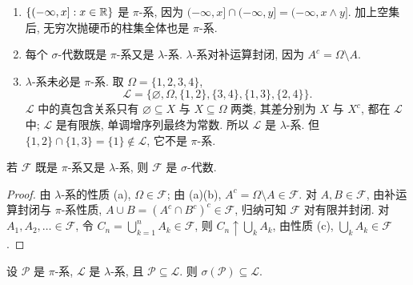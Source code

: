 \begin{example}\label{ex:pi-lambda}
\begin{enumerate}
\item $\{(-\infty,x]: x\in\mathbb{R}\}$ 是 $\pi$-系, 因为 $(-\infty,x]\cap(-\infty,y]=(-\infty,x\wedge y]$. 加上空集后, 无穷次抛硬币的柱集全体也是 $\pi$-系.
\item 每个 $\sigma$-代数既是 $\pi$-系又是 $\lambda$-系. $\lambda$-系对补运算封闭, 因为 $A^c=\Omega\setminus A$.
\item $\lambda$-系未必是 $\pi$-系. 取 $\Omega=\{1,2,3,4\}$,
\[
\mathcal{L}=\big\{\varnothing,\Omega,\{1,2\},\{3,4\},\{1,3\},\{2,4\}\big\}.
\]
$\mathcal{L}$ 中的真包含关系只有 $\varnothing\subseteq X$ 与 $X\subseteq\Omega$ 两类, 其差分别为 $X$ 与 $X^c$, 都在 $\mathcal{L}$ 中; $\mathcal{L}$ 是有限族, 单调增序列最终为常数. 所以 $\mathcal{L}$ 是 $\lambda$-系. 但 $\{1,2\}\cap\{1,3\}=\{1\}\notin\mathcal{L}$, 它不是 $\pi$-系.
\end{enumerate}
\end{example}

\begin{lemma}\label{lem:pi-and-lambda}
若 $\mathcal{F}$ 既是 $\pi$-系又是 $\lambda$-系, 则 $\mathcal{F}$ 是 $\sigma$-代数.
\end{lemma}

\begin{proof}
由 $\lambda$-系的性质 (a), $\Omega\in\mathcal{F}$; 由 (a)(b), $A^c=\Omega\setminus A\in\mathcal{F}$. 对 $A,B\in\mathcal{F}$, 由补运算封闭与 $\pi$-系性质, $A\cup B=(A^c\cap B^c)^c\in\mathcal{F}$, 归纳可知 $\mathcal{F}$ 对有限并封闭. 对 $A_1,A_2,\dots\in\mathcal{F}$, 令 $C_n=\bigcup_{k=1}^n A_k\in\mathcal{F}$, 则 $C_n\uparrow\bigcup_k A_k$, 由性质 (c), $\bigcup_k A_k\in\mathcal{F}$.
\end{proof}

\begin{theorem}\label{thm:pi-lambda}
设 $\mathcal{P}$ 是 $\pi$-系, $\mathcal{L}$ 是 $\lambda$-系, 且 $\mathcal{P}\subseteq\mathcal{L}$. 则 $\sigma(\mathcal{P})\subseteq\mathcal{L}$.
\end{theorem}

